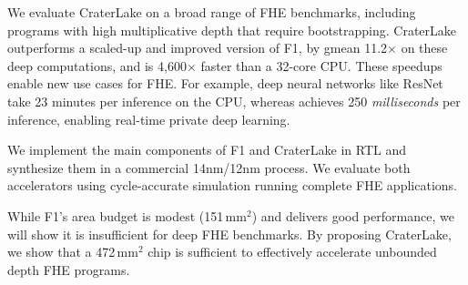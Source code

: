 We evaluate CraterLake on a broad range of FHE benchmarks, including programs
with high multiplicative depth that require bootstrapping. CraterLake
outperforms a scaled-up and improved version of F1, by gmean 11.2$\times$ on
these deep computations, and is 4,600$\times$ faster than a 32-core CPU. These
speedups enable new use cases for FHE. For example, deep neural networks like
ResNet take 23 minutes per inference on the CPU, whereas \name achieves 250
\emph{milliseconds} per inference, enabling real-time private deep learning.

We implement the main components of F1 and CraterLake in RTL and synthesize
them in a commercial 14nm/12nm process. We evaluate both accelerators using
cycle-accurate simulation running complete FHE applications.

While F1's area budget is modest (151\,mm$^2$) and delivers good performance,
we will show it is insufficient for deep FHE benchmarks. By proposing
CraterLake, we show that a 472\,mm$^2$ chip is sufficient to effectively
accelerate unbounded depth FHE programs.
